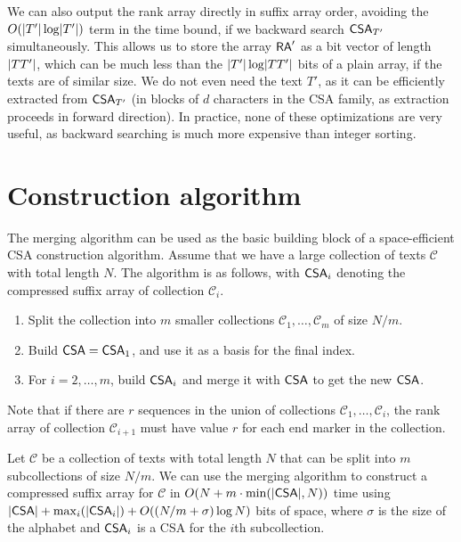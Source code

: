We can also output the rank array directly in suffix array order, avoiding the $O(\lvert T' \rvert \log \lvert T' \rvert)$ term in the time bound, if we backward search $\mathsf{CSA}_{T'}$ simultaneously. This allows us to store the array $\mathsf{RA}'$ as a bit vector of length $\lvert TT' \rvert$, which can be much less than the $\lvert T' \rvert \log \lvert TT' \rvert$ bits of a plain array, if the texts are of similar size. We do not even need the text $T'$, as it can be efficiently extracted from $\mathsf{CSA}_{T'}$ (in blocks of $d$ characters in the CSA family, as extraction proceeds in forward direction). In practice, none of these optimizations are very useful, as backward searching is much more expensive than integer sorting.


\section{Construction algorithm}\label{sect:construction}

The merging algorithm can be used as the basic building block of a space-efficient CSA construction algorithm. Assume that we have a large collection of texts $\mathcal{C}$ with total length $N$. The algorithm is as follows, with $\mathsf{CSA}_{i}$ denoting the compressed suffix array of collection $\mathcal{C}_{i}$.
\begin{enumerate}
\item Split the collection into $m$ smaller collections $\mathcal{C}_{1}, \dotsc, \mathcal{C}_{m}$ of size $N/m$.
\item Build $\mathsf{CSA} = \mathsf{CSA}_{1}$, and use it as a basis for the final index.
\item For $i = 2, \dotsc, m$, build $\mathsf{CSA}_{i}$ and merge it with $\mathsf{CSA}$ to get the new $\mathsf{CSA}$.
\end{enumerate}

Note that if there are $r$ sequences in the union of collections $\mathcal{C}_{1}, \dotsc, \mathcal{C}_{i}$, the rank array of collection $\mathcal{C}_{i+1}$ must have value $r$ for each end marker in the collection.

\begin{theorem}
Let $\mathcal{C}$ be a collection of texts with total length $N$ that can be split into $m$ subcollections of size $N/m$. We can use the merging algorithm to construct a compressed suffix array for $\mathcal{C}$ in $O(N + m \cdot \min(\lvert \mathsf{CSA} \rvert, N))$ time using $\lvert \mathsf{CSA} \rvert + \max_{i}(\lvert \mathsf{CSA}_{i} \rvert) + O((N/m + \sigma) \log N)$ bits of space, where $\sigma$ is the size of the alphabet and $\mathsf{CSA}_{i}$ is a CSA for the $i$th subcollection.
\end{theorem}

